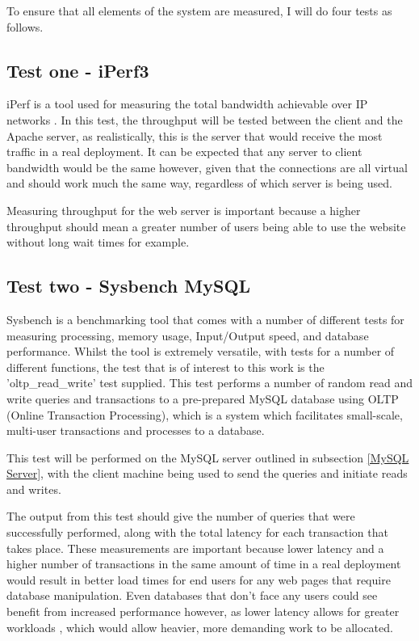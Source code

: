 To ensure that all elements of the system are measured, I will do four tests as follows.

\subsection{Test one - iPerf3}
iPerf is a tool used for measuring the total bandwidth achievable over IP networks \citep{iPerf3}. In this test, the throughput will be tested between the client and the Apache server, as realistically, this is the server that would receive the most traffic in a real deployment. It can be expected that any server to client bandwidth would be the same however, given that the connections are all virtual and should work much the same way, regardless of which server is being used.

Measuring throughput for the web server is important because a higher throughput should mean a greater number of users being able to use the website without long wait times for example.

\subsection{Test two - Sysbench MySQL}
Sysbench is a benchmarking tool that comes with a number of different tests for measuring processing, memory usage, Input/Output speed, and database performance\citep{sysbench}. Whilst the tool is extremely versatile, with tests for a number of different functions, the test that is of interest to this work is the 'oltp\_read\_write' test supplied. This test performs a number of random read and write queries and transactions to a pre-prepared MySQL database using OLTP (Online Transaction Processing), which is a system which facilitates small-scale, multi-user transactions and processes to a database\citep{oltpbenchmarking}.

This test will be performed on the MySQL server outlined in subsection \ref{MySQL Server}, with the client machine being used to send the queries and initiate reads and writes.

The output from this test should give the number of queries that were successfully performed, along with the total latency for each transaction that takes place. These measurements are important because lower latency and a higher number of transactions in the same amount of time in a real deployment would result in better load times for end users for any web pages that require database manipulation. Even databases that don't face any users could see benefit from increased performance however, as lower latency allows for greater workloads \citep{MySQLlatency}, which would allow heavier, more demanding work to be allocated.

